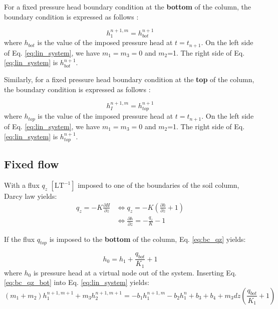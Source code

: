 \documentclass[a4paper,12pt]{article}
\begin{document}
For a fixed pressure head boundary condition at the \textbf{bottom} of the column, the boundary condition is expressed as follows :

\begin{equation}\label{eq:bc_fixed_bot}
    h_1^{n+1,m} = h_{bot}^{n+1}
\end{equation}
where $h_{bot}$ is the value of the imposed pressure head at $t = t_{n+1}$. On the left side of Eq. \ref{eq:lin_system}, we have $m_1 = m_3 = 0$ and $m_2$=1. The right side of Eq. \ref{eq:lin_system} is $h_{bot}^{n+1}$.

Similarly, for a fixed pressure head boundary condition at the \textbf{top} of the column, the boundary condition is expressed as follows :

\begin{equation} \label{eq:bc_fixed_top}
    h_I^{n+1,m} = h_{top}^{n+1}
\end{equation}
where $h_{top}$ is the value of the imposed pressure head at $t = t_{n+1}$. On the left side of Eq. \ref{eq:lin_system}, we have $m_1 = m_3 = 0$ and $m_2$=1. The right side of Eq. \ref{eq:lin_system} is $h_{top}^{n+1}$.


\subsection{Fixed flow}

With a flux $q_z$ $\mathrm{[LT^{-1}]}$ imposed to one of the boundaries of the soil column, Darcy law yields: 
\begin{align} \label{eq:bc_qz}
    q_z = -K \frac{\partial H}{\partial z} &\iff q_z= -K \left( \frac{\partial h}{\partial z} + 1 \right) \nonumber \\
					   &\iff \frac{\partial h}{\partial z} = - \frac{q_z}{K} - 1 
\end{align}

If the flux $q_{top}$ is imposed to the \textbf{bottom} of the column, Eq. \ref{eq:bc_qz} yields:

\begin{equation} \label{eq:bc_qz_bot}
     h_0 = h_1  + \frac{q_{bot}}{K_1} + 1
\end{equation}
where $h_{0}$ is pressure head at a virtual node out of the system. Inserting Eq. \ref{eq:bc_qz_bot} into Eq. \ref{eq:lin_system} yields: 
\begin{equation} \label{eq:bc_qz_lin_system_bot}
    (m_1 + m_2) h_1^{n+1,m+1} + m_3 h_{2}^{n+1,m+1} = - b_1 h_1^{n+1,m} - b_2 h_1^n + b_3 + b_4 + m_3 dz \left( \frac{q_{bot}}{K_1} +1 \right)
\end{equation}
\end{document}
